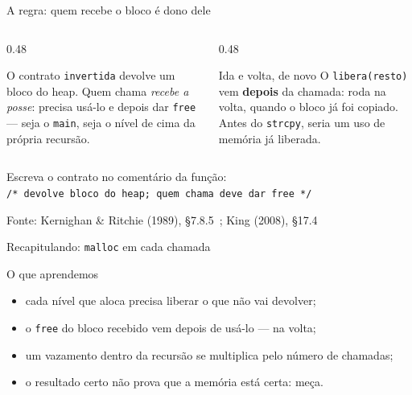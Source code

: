 \documentclass[aspectratio=169]{beamer}
\newcommand{\fonte}[1]{\vfill\hfill{\scriptsize\textcolor{UFSGray}{Fonte: #1}}}
\begin{document}
\begin{frame}{A regra: quem recebe o bloco é dono dele}
  \begin{columns}[T]
    \begin{column}{0.48\textwidth}
      \begin{block}{O contrato}
        \small \texttt{invertida} devolve um bloco do heap. Quem chama
        \emph{recebe a posse}: precisa usá-lo e depois dar \texttt{free}
        --- seja o \texttt{main}, seja o nível de cima da própria recursão.
      \end{block}
    \end{column}
    \begin{column}{0.48\textwidth}
      \begin{block}{Ida e volta, de novo}
        \small O \texttt{libera(resto)} vem \textbf{depois} da chamada:
        roda na volta, quando o bloco já foi copiado. Antes do
        \texttt{strcpy}, seria um uso de memória já liberada.
      \end{block}
    \end{column}
  \end{columns}
  \medskip
  \begin{center}
    \small Escreva o contrato no comentário da função:\\[0.2em]
    \texttt{/* devolve bloco do heap; quem chama deve dar free */}
  \end{center}
  \fonte{Kernighan \& Ritchie (1989), §7.8.5~\cite{kernighan1989c};
    King (2008), §17.4~\cite{king2008c}}
\end{frame}

\begin{frame}{Recapitulando: \texttt{malloc} em cada chamada}
  \begin{block}{O que aprendemos}
    \begin{itemize}
      \item cada nível que aloca precisa liberar o que não vai devolver;
      \item o \texttt{free} do bloco recebido vem depois de usá-lo --- na
        volta;
      \item um vazamento dentro da recursão se multiplica pelo número de
        chamadas;
      \item o resultado certo não prova que a memória está certa: meça.
    \end{itemize}
  \end{block}
\end{frame}

\end{document}

